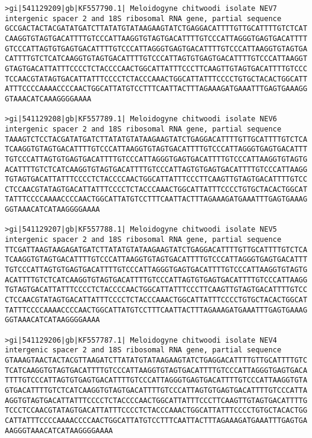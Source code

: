 \documentclass[11pt]{article}
\begin{document}
\begin{Verbatim}[commandchars=\\\{\}]
>gi|541129209|gb|KF557790.1| Meloidogyne chitwoodi isolate NEV7 intergenic spacer 2 and 18S ribosomal RNA gene, partial sequence
GCCGACTACTACGATATGATCTTATATGTATAAGAAGTATCTGAGGACATTTTGTTGCATTTTGTCTCAT
CAAGGTGTAGTGACATTTTGTCCCATTAAGGTGTAGTGACATTTTGTCCCATTAGGGTGAGTGACATTTT
GTCCCATTAGTGTGAGTGACATTTTGTCCCATTAGGGTGAGTGACATTTTGTCCCATTAAGGTGTAGTGA
CATTTTGTCTCATCAAGGTGTAGTGACATTTTGTCCCATTAGTGTGAGTGACATTTTGTCCCATTAAGGT
GTAGTGACATTATTTCCCCTCTACCCCAACTGGCATTATTTCCCTTCAAGTTGTAGTGACATTTTGTCCC
TCCAACGTATAGTGACATTATTTCCCCTCTACCCAAACTGGCATTATTTCCCCTGTGCTACACTGGCATT
ATTTCCCCAAAACCCCAACTGGCATTATGTCCTTTCAATTACTTTAGAAAGATGAAATTTGAGTGAAAGG
GTAAACATCAAAGGGGAAAA

>gi|541129208|gb|KF557789.1| Meloidogyne chitwoodi isolate NEV6 intergenic spacer 2 and 18S ribosomal RNA gene, partial sequence
TAAAGTCTCCTACGATATGATCTTATATGTATAAGAAGTATCTGAGGACATTTTGTTGCATTTTGTCTCA
TCAAGGTGTAGTGACATTTTGTCCCATTAAGGTGTAGTGACATTTTGTCCCATTAGGGTGAGTGACATTT
TGTCCCATTAGTGTGAGTGACATTTTGTCCCATTAGGGTGAGTGACATTTTGTCCCATTAAGGTGTAGTG
ACATTTTGTCTCATCAAGGTGTAGTGACATTTTGTCCCATTAGTGTGAGTGACATTTTGTCCCATTAAGG
TGTAGTGACATTATTTCCCCTCTACCCCAACTGGCATTATTTCCCTTCAAGTTGTAGTGACATTTTGTCC
CTCCAACGTATAGTGACATTATTTCCCCTCTACCCAAACTGGCATTATTTCCCCTGTGCTACACTGGCAT
TATTTCCCCAAAACCCCAACTGGCATTATGTCCTTTCAATTACTTTAGAAAGATGAAATTTGAGTGAAAG
GGTAAACATCATAAGGGGAAAA

>gi|541129207|gb|KF557788.1| Meloidogyne chitwoodi isolate NEV5 intergenic spacer 2 and 18S ribosomal RNA gene, partial sequence
TTCGATTAAGTAAGAGATGATCTTATATGTATAAGAAGTATCTGAGGACATTTTGTTGCATTTTGTCTCA
TCAAGGTGTAGTGACATTTTGTCCCATTAAGGTGTAGTGACATTTTGTCCCATTAGGGTGAGTGACATTT
TGTCCCATTAGTGTGAGTGACATTTTGTCCCATTAGGGTGAGTGACATTTTGTCCCATTAAGGTGTAGTG
ACATTTTGTCTCATCAAGGTGTAGTGACATTTTGTCCCATTAGTGTGAGTGACATTTTGTCCCATTAAGG
TGTAGTGACATTATTTCCCCTCTACCCCAACTGGCATTATTTCCCTTCAAGTTGTAGTGACATTTTGTCC
CTCCAACGTATAGTGACATTATTTCCCCTCTACCCAAACTGGCATTATTTCCCCTGTGCTACACTGGCAT
TATTTCCCCAAAACCCCAACTGGCATTATGTCCTTTCAATTACTTTAGAAAGATGAAATTTGAGTGAAAG
GGTAAACATCATAAGGGGAAAA

>gi|541129206|gb|KF557787.1| Meloidogyne chitwoodi isolate NEV4 intergenic spacer 2 and 18S ribosomal RNA gene, partial sequence
GTAAAGTAACTACTACGTTAAGATCTTATATGTATAAGAAGTATCTGAGGACATTTTGTTGCATTTTGTC
TCATCAAGGTGTAGTGACATTTTGTCCCATTAAGGTGTAGTGACATTTTGTCCCATTAGGGTGAGTGACA
TTTTGTCCCATTAGTGTGAGTGACATTTTGTCCCATTAGGGTGAGTGACATTTTGTCCCATTAAGGTGTA
GTGACATTTTGTCTCATCAAGGTGTAGTGACATTTTGTCCCATTAGTGTGAGTGACATTTTGTCCCATTA
AGGTGTAGTGACATTATTTCCCCTCTACCCCAACTGGCATTATTTCCCTTCAAGTTGTAGTGACATTTTG
TCCCTCCAACGTATAGTGACATTATTTCCCCTCTACCCAAACTGGCATTATTTCCCCTGTGCTACACTGG
CATTATTTCCCCAAAACCCCAACTGGCATTATGTCCTTTCAATTACTTTAGAAAGATGAAATTTGAGTGA
AAGGGTAAACATCATAAGGGGAAAA


\end{Verbatim}
\end{document}
